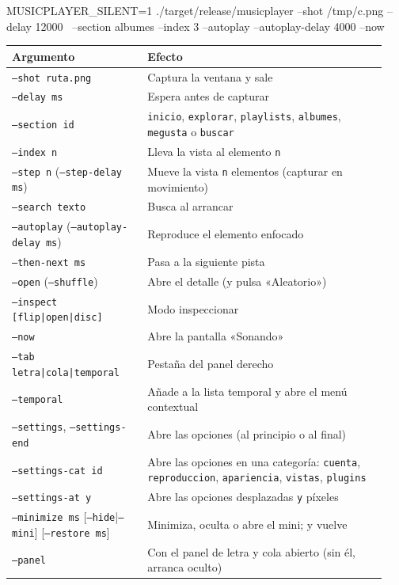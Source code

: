 \begin{terminal}
MUSICPLAYER_SILENT=1 ./target/release/musicplayer --shot /tmp/c.png --delay 12000 \
  --section albumes --index 3 --autoplay --autoplay-delay 4000 --now
\end{terminal}

\begin{center}
\small
\begin{longtable}{@{}p{0.34\linewidth}p{0.6\linewidth}@{}}
\toprule
Argumento & Efecto \\
\midrule
\endhead
\texttt{--shot ruta.png} & Captura la ventana y sale \\
\texttt{--delay ms} & Espera antes de capturar \\
\texttt{--section id} & \texttt{inicio}, \texttt{explorar}, \texttt{playlists}, \texttt{albumes}, \texttt{megusta} o \texttt{buscar} \\
\texttt{--index n} & Lleva la vista al elemento \texttt{n} \\
\texttt{--step n} (\texttt{--step-delay ms}) & Mueve la vista \texttt{n} elementos (capturar en movimiento) \\
\texttt{--search texto} & Busca al arrancar \\
\texttt{--autoplay} (\texttt{--autoplay-delay ms}) & Reproduce el elemento enfocado \\
\texttt{--then-next ms} & Pasa a la siguiente pista \\
\texttt{--open} (\texttt{--shuffle}) & Abre el detalle (y pulsa «Aleatorio») \\
\texttt{--inspect [flip|open|disc]} & Modo inspeccionar \\
\texttt{--now} & Abre la pantalla «Sonando» \\
\texttt{--tab letra|cola|temporal} & Pestaña del panel derecho \\
\texttt{--temporal} & Añade a la lista temporal y abre el menú contextual \\
\texttt{--settings}, \texttt{--settings-end} & Abre las opciones (al principio o al final) \\
\texttt{--settings-cat id} & Abre las opciones en una categoría: \texttt{cuenta}, \texttt{reproduccion}, \texttt{apariencia}, \texttt{vistas}, \texttt{plugins} \\
\texttt{--settings-at y} & Abre las opciones desplazadas \texttt{y} píxeles \\
\texttt{--minimize ms} [\texttt{--hide}|\texttt{--mini}] [\texttt{--restore ms}] & Minimiza, oculta o abre el mini; y vuelve \\
\texttt{--panel} & Con el panel de letra y cola abierto (sin él, arranca oculto) \\
\bottomrule
\end{longtable}
\end{center}

